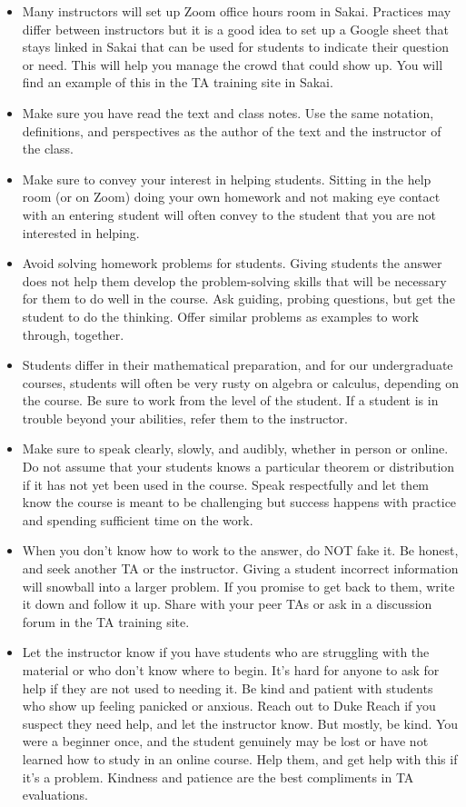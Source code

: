 \documentclass[
]{article}
\begin{document}
\begin{itemize}
\item
  Many instructors will set up Zoom office hours room in Sakai. Practices may differ between instructors but it is a good idea to set up a Google sheet that stays linked in Sakai that can be used for students to indicate their question or need. This will help you manage the crowd that could show up. You will find an example of this in the TA training site in Sakai.
\item
  Make sure you have read the text and class notes. Use the same notation, definitions, and perspectives as the author of the text and the instructor of the class.
\item
  Make sure to convey your interest in helping students. Sitting in the help room (or on Zoom) doing your own homework and not making eye contact with an entering student will often convey to the student that you are not interested in helping.
\item
  Avoid solving homework problems for students. Giving students the answer does not help them develop the problem-solving skills that will be necessary for them to do well in the course. Ask guiding, probing questions, but get the student to do the thinking. Offer similar problems as examples to work through, together.
\item
  Students differ in their mathematical preparation, and for our undergraduate courses, students will often be very rusty on algebra or calculus, depending on the course. Be sure to work from the level of the student. If a student is in trouble beyond your abilities, refer them to the instructor.
\item
  Make sure to speak clearly, slowly, and audibly, whether in person or online. Do not assume that your students knows a particular theorem or distribution if it has not yet been used in the course. Speak respectfully and let them know the course is meant to be challenging but success happens with practice and spending sufficient time on the work.
\item
  When you don't know how to work to the answer, do NOT fake it. Be honest, and seek another TA or the instructor. Giving a student incorrect information will snowball into a larger problem. If you promise to get back to them, write it down and follow it up. Share with your peer TAs or ask in a discussion forum in the TA training site.
\item
  Let the instructor know if you have students who are struggling with the material or who don't know where to begin. It's hard for anyone to ask for help if they are not used to needing it. Be kind and patient with students who show up feeling panicked or anxious. Reach out to Duke Reach if you suspect they need help, and let the instructor know. But mostly, be kind. You were a beginner once, and the student genuinely may be lost or have not learned how to study in an online course. Help them, and get help with this if it's a problem. Kindness and patience are the best compliments in TA evaluations.
\end{itemize}
\end{document}
